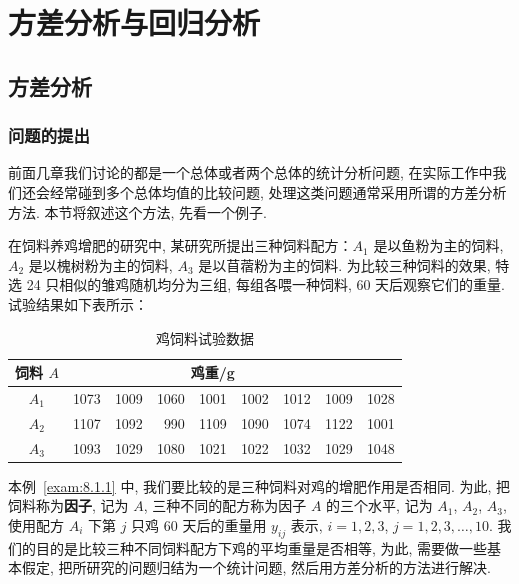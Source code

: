 \setcounter{chapter}{7}
\chapter{方差分析与回归分析}\label{cha:8}

\section{方差分析}\label{sec:8.1}
\subsection{问题的提出}
前面几章我们讨论的都是一个总体或者两个总体的统计分析问题, 在实际工作中我们还会经常碰到多个总体均值的比较问题, 处理这类问题通常采用所谓的方差分析方法. 本节将叙述这个方法, 先看一个例子. 

\begin{example}\label{exam:8.1.1}
在饲料养鸡增肥的研究中, 某研究所提出三种饲料配方：$A_1$ 是以鱼粉为主的饲料, $A_2$ 是以槐树粉为主的饲料, $A_3$ 是以苜蓿粉为主的饲料. 为比较三种饲料的效果, 特选 24 只相似的雏鸡随机均分为三组, 每组各喂一种饲料, 60 天后观察它们的重量. 试验结果如下表所示：

\begin{table}[htbp]
  \centering
  \caption{鸡饲料试验数据}
    \begin{tabular}{c|rrrrrrrr}
    \toprule
    饲料 $A$   & \multicolumn{7}{c}{鸡重/\si{\gram}                     } &      \\
    \midrule
    $A_1$  & 1073  & 1009  & 1060  & 1001  & 1002  & 1012  & 1009  & 1028 \\
    $A_2$  & 1107  & 1092  & 990   & 1109  & 1090  & 1074  & 1122  & 1001 \\
    $A_3$  & 1093  & 1029  & 1080  & 1021  & 1022  & 1032  & 1029  & 1048 \\
    \bottomrule
    \end{tabular}%
  \label{tab:8.1.1}%
\end{table}%
\end{example}

本例~\ref{exam:8.1.1} 中, 我们要比较的是三种饲料对鸡的增肥作用是否相同. 为此, 把饲料称为\textbf{因子}, 记为 $A$, 三种不同的配方称为因子 $A$ 的三个水平, 记为 $A_1$, $A_2$, $A_3$, 使用配方 $A_i$ 下第 $j$ 只鸡 60 天后的重量用 $y_{ij}$ 表示, $i = 1,2,3$, $j =1,2,3,\ldots,10$. 我们的目的是比较三种不同饲料配方下鸡的平均重量是否相等, 为此, 需要做一些基本假定, 把所研究的问题归结为一个统计问题, 然后用方差分析的方法进行解决. 

